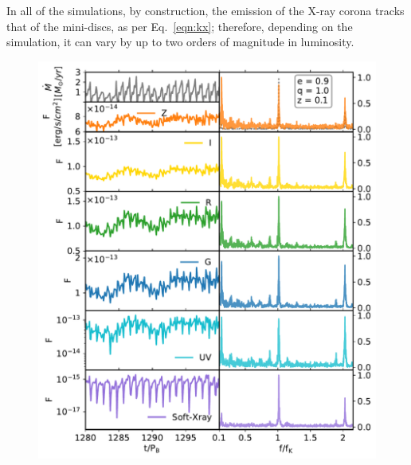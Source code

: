 \documentclass{aa}
\begin{document}
In all of the simulations, by construction, the emission of the X-ray corona tracks that of the mini-discs, as per Eq.~\eqref{eqn:kx}; therefore, depending on the simulation, it can vary by up to two orders of magnitude in luminosity.


\begin{figure}
    \centering
    \includegraphics[width=\columnwidth]{Figures/e09q1_hr01_md001_3aOpticAll_Flux_bands_9000_0.1_new.pdf}

\end{figure}
\end{document}
